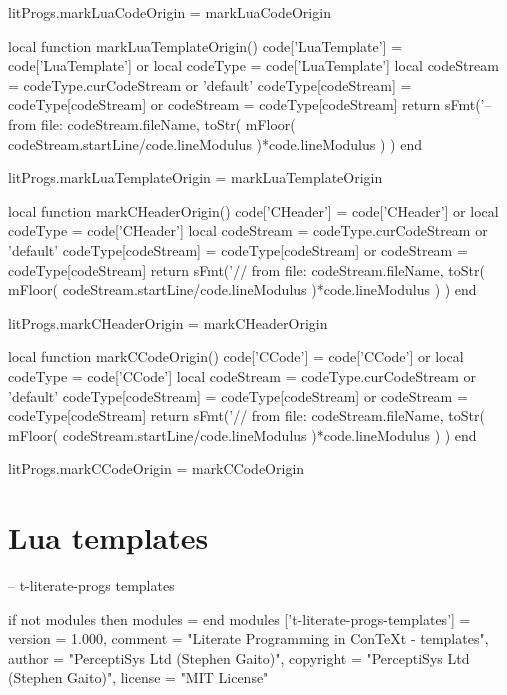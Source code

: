 litProgs.markLuaCodeOrigin = markLuaCodeOrigin

local function markLuaTemplateOrigin()
  code['LuaTemplate']  = code['LuaTemplate'] or { }
  local codeType       = code['LuaTemplate']
  local codeStream     = codeType.curCodeStream or 'default'
  codeType[codeStream] = codeType[codeStream] or { }
  codeStream           = codeType[codeStream]
  return sFmt('-- from file: %
    codeStream.fileName,
    toStr(
      mFloor(
        codeStream.startLine/code.lineModulus
      )*code.lineModulus
    )
  )
end

litProgs.markLuaTemplateOrigin = markLuaTemplateOrigin

local function markCHeaderOrigin()
  code['CHeader']      = code['CHeader'] or { }
  local codeType       = code['CHeader']
  local codeStream     = codeType.curCodeStream or 'default'
  codeType[codeStream] = codeType[codeStream] or { }
  codeStream           = codeType[codeStream]
  return sFmt('// from file: %
    codeStream.fileName,
    toStr(
      mFloor(
        codeStream.startLine/code.lineModulus
      )*code.lineModulus
    )
  )
end

litProgs.markCHeaderOrigin = markCHeaderOrigin

local function markCCodeOrigin()
  code['CCode']        = code['CCode'] or { }
  local codeType       = code['CCode']
  local codeStream     = codeType.curCodeStream or 'default'
  codeType[codeStream] = codeType[codeStream] or { }
  codeStream           = codeType[codeStream]
  return sFmt('// from file: %
    codeStream.fileName,
    toStr(
      mFloor(
        codeStream.startLine/code.lineModulus
      )*code.lineModulus
    )
  )
end

litProgs.markCCodeOrigin = markCCodeOrigin
\stopLuaCode

\setLitProgsOriginMarker[MkIVCode][markMkIVCodeOrigin]
\setLitProgsOriginMarker[LuaCode][markLuaCodeOrigin]
\setLitProgsOriginMarker[LuaTemplate][markLuaTemplateOrigin]

\section{Lua templates}

\startLuaTemplate
-- t-literate-progs templates

if not modules then modules = { } end
modules ['t-literate-progs-templates'] = {
    version   = 1.000,
    comment   = "Literate Programming in ConTeXt - templates",
    author    = "PerceptiSys Ltd (Stephen Gaito)",
    copyright = "PerceptiSys Ltd (Stephen Gaito)",
    license   = "MIT License"
}

